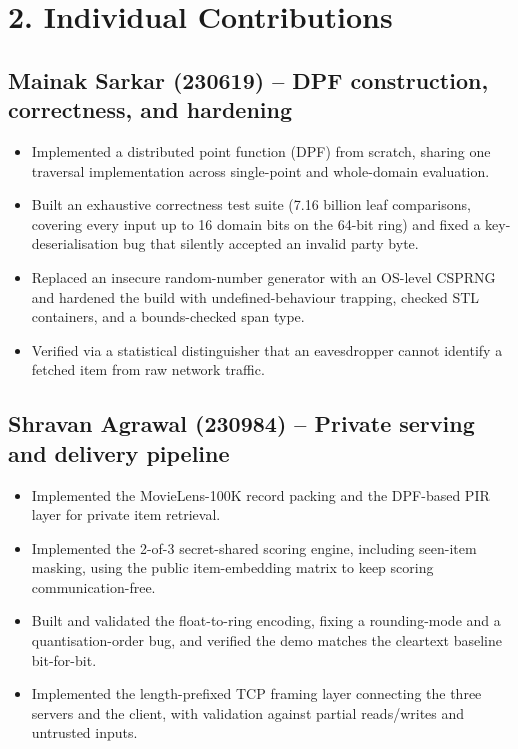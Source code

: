 \documentclass[11pt]{article}
\begin{document}
\section*{2. Individual Contributions}

\subsection*{Mainak Sarkar (230619) -- DPF construction, correctness, and hardening}
\begin{itemize}
    \item Implemented a distributed point function (DPF) from scratch, sharing one traversal implementation across single-point and whole-domain evaluation.
    \item Built an exhaustive correctness test suite (7.16 billion leaf comparisons, covering every input up to 16 domain bits on the 64-bit ring) and fixed a key-deserialisation bug that silently accepted an invalid party byte.
    \item Replaced an insecure random-number generator with an OS-level CSPRNG and hardened the build with undefined-behaviour trapping, checked STL containers, and a bounds-checked span type.
    \item Verified via a statistical distinguisher that an eavesdropper cannot identify a fetched item from raw network traffic.
\end{itemize}

\subsection*{Shravan Agrawal (230984) -- Private serving and delivery pipeline}
\begin{itemize}
    \item Implemented the MovieLens-100K record packing and the DPF-based PIR layer for private item retrieval.
    \item Implemented the 2-of-3 secret-shared scoring engine, including seen-item masking, using the public item-embedding matrix to keep scoring communication-free.
    \item Built and validated the float-to-ring encoding, fixing a rounding-mode and a quantisation-order bug, and verified the demo matches the cleartext baseline bit-for-bit.
    \item Implemented the length-prefixed TCP framing layer connecting the three servers and the client, with validation against partial reads/writes and untrusted inputs.
\end{itemize}
\end{document}
